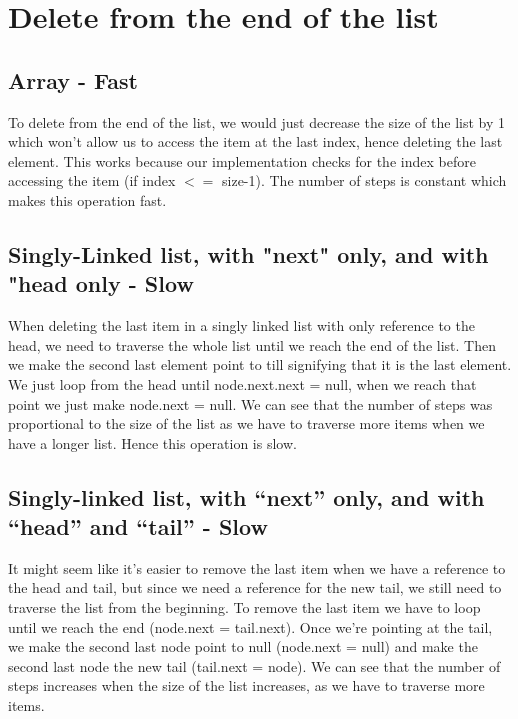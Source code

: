 \documentclass{article}
\begin{document}


\section{Delete from the end of the list}
\subsection{Array - Fast}
To delete from the end of the list, we would just decrease the size of the list by 1 which won't allow us to access the item at the last index, hence deleting the last element. This works because our implementation checks for the index before accessing the item (if index $<=$ size-1). The number of steps is constant which makes this operation fast.


\subsection{Singly-Linked list, with "next" only, and with "head only - Slow}
When deleting the last item in a singly linked list with only reference to the head, we need to traverse the whole list until we reach the end of the list. Then we make the second last element point to till signifying that it is the last element. We just loop from the head until node.next.next = null, when we reach that point we just make node.next = null. We can see that the number of steps was proportional to the size of the list as we have to traverse more items when we have a longer list. Hence this operation is slow.

\subsection{Singly-linked list, with “next” only, and with “head” and “tail” - Slow}
It might seem like it's easier to remove the last item when we have a reference to the head and tail, but since we need a reference for the new tail, we still need to traverse the list from the beginning. To remove the last item we have to loop until we reach the end (node.next = tail.next). Once we're pointing at the tail, we make the second last node point to null (node.next = null) and make the second last node the new tail (tail.next = node). We can see that the number of steps increases when the size of the list increases, as we have to traverse more items.
\end{document}
